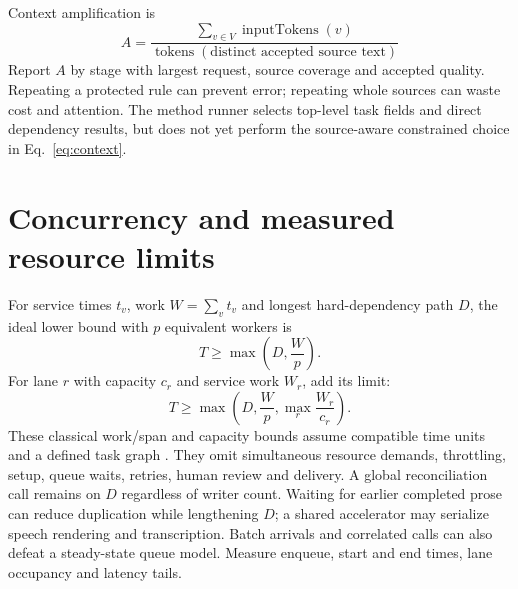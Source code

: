 \documentclass[11pt,letterpaper]{article}
\begin{document}
Context amplification is
\begin{equation}
A=\frac{\sum_{v\in V}\operatorname{inputTokens}(v)}{\operatorname{tokens}(\text{distinct accepted source text})}
\label{eq:amplification}
\end{equation}
Report $A$ by stage with largest request, source coverage and accepted quality. Repeating a protected rule can prevent error; repeating whole sources can waste cost and attention. The method runner selects top-level task fields and direct dependency results, but does not yet perform the source-aware constrained choice in Eq.~\ref{eq:context}.

\section{Concurrency and measured resource limits}
For service times $t_v$, work $W=\sum_v t_v$ and longest hard-dependency path $D$, the ideal lower bound with $p$ equivalent workers is
\begin{equation}
T\geq\max\left(D,\frac{W}{p}\right).
\label{eq:workspan}
\end{equation}
For lane $r$ with capacity $c_r$ and service work $W_r$, add its limit:
\begin{equation}
T\geq\max\left(D,\frac{W}{p},\max_r\frac{W_r}{c_r}\right).
\label{eq:lanebound}
\end{equation}
These classical work/span and capacity bounds assume compatible time units and a defined task graph \cite{blumofe1999scheduling}. They omit simultaneous resource demands, throttling, setup, queue waits, retries, human review and delivery. A global reconciliation call remains on $D$ regardless of writer count. Waiting for earlier completed prose can reduce duplication while lengthening $D$; a shared accelerator may serialize speech rendering and transcription. Batch arrivals and correlated calls can also defeat a steady-state queue model. Measure enqueue, start and end times, lane occupancy and latency tails.
\end{document}
